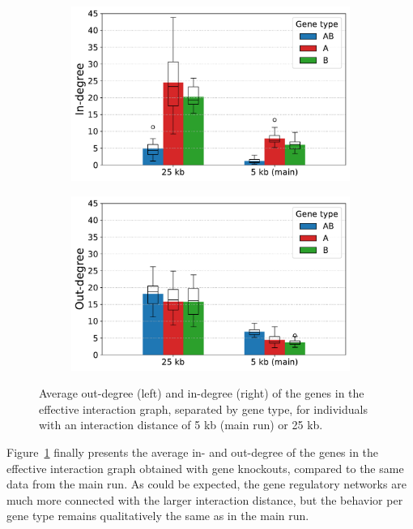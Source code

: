 \begin{figure}[H]
\centering
  \begin{subfigure}[t]{0.495\textwidth}
    \includegraphics[width=\textwidth]{param/interaction-25k/effective_graph_combined_in_degree.pdf}
  \end{subfigure}
  \begin{subfigure}[t]{0.495\textwidth}
    \includegraphics[width=\textwidth]{param/interaction-25k/effective_graph_combined_out_degree.pdf}
  \end{subfigure}
  \caption[Average in- and out-degree of effective interaction graph nodes, with an interaction distance of 25 kb]{Average out-degree (left) and in-degree (right) of the genes in the effective interaction graph, separated by gene type, for individuals with an interaction distance of 5 kb (main run) or 25 kb.}
  \label{fig:param:inter25k-degree}
\end{figure}

Figure~\ref{fig:param:inter25k-degree} finally presents the average in- and out-degree of the genes in the effective interaction graph obtained with gene knockouts, compared to the same data from the main run.
As could be expected, the gene regulatory networks are much more connected with the larger interaction distance, but the behavior per gene type remains qualitatively the same as in the main run.


